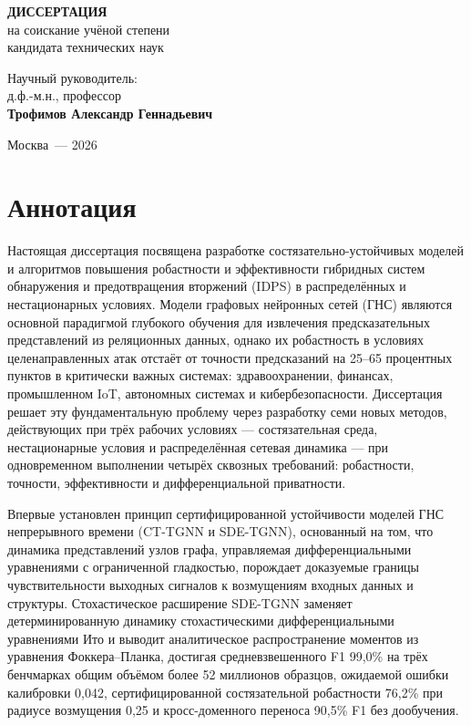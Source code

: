 \begin{titlepage}
\begin{center}
\textbf{ДИССЕРТАЦИЯ}\\[2pt]
на соискание учёной степени\\
кандидата технических наук

\end{center}

\vspace{2.2cm}

\hfill
\begin{minipage}{0.55\textwidth}
\small
Научный руководитель:\\
д.ф.-м.н., профессор\\
\textbf{Трофимов Александр Геннадьевич}
\end{minipage}

\vfill

\begin{center}
Москва~--- 2026
\end{center}
\end{titlepage}


\chapter*{Аннотация}

Настоящая диссертация посвящена разработке состязательно-устойчивых моделей и алгоритмов повышения робастности и эффективности гибридных систем обнаружения и предотвращения вторжений (IDPS) в распределённых и нестационарных условиях. Модели графовых нейронных сетей (ГНС) являются основной парадигмой глубокого обучения для извлечения предсказательных представлений из реляционных данных, однако их робастность в условиях целенаправленных атак отстаёт от точности предсказаний на 25--65 процентных пунктов в критически важных системах: здравоохранении, финансах, промышленном IoT, автономных системах и кибербезопасности. Диссертация решает эту фундаментальную проблему через разработку семи новых методов, действующих при трёх рабочих условиях --- состязательная среда, нестационарные условия и распределённая сетевая динамика --- при одновременном выполнении четырёх сквозных требований: робастности, точности, эффективности и дифференциальной приватности.

Впервые установлен принцип сертифицированной устойчивости моделей ГНС непрерывного времени (CT-TGNN и SDE-TGNN), основанный на том, что динамика представлений узлов графа, управляемая дифференциальными уравнениями с ограниченной гладкостью, порождает доказуемые границы чувствительности выходных сигналов к возмущениям входных данных и структуры. Стохастическое расширение SDE-TGNN заменяет детерминированную динамику стохастическими дифференциальными уравнениями Ито и выводит аналитическое распространение моментов из уравнения Фоккера--Планка, достигая средневзвешенного F1 99,0\% на трёх бенчмарках общим объёмом более 52 миллионов образцов, ожидаемой ошибки калибровки 0,042, сертифицированной состязательной робастности 76,2\% при радиусе возмущения 0,25 и кросс-доменного переноса 90,5\% F1 без дообучения.

